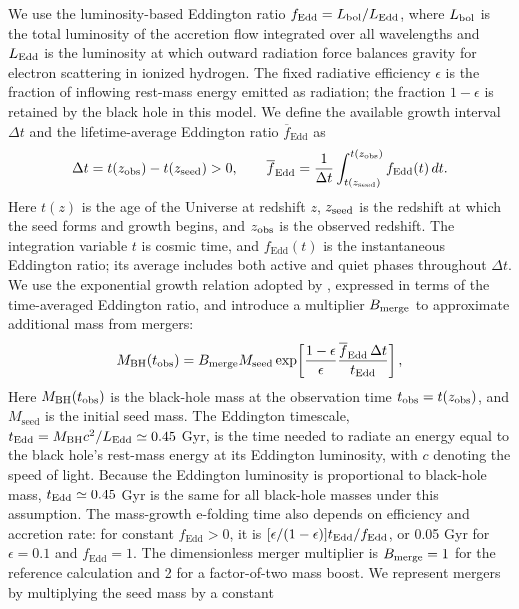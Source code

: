\documentclass[11pt]{article}
\newcommand{\fedd}{f_{\mathrm{Edd}}}
\newcommand{\mbh}{M_{\mathrm{BH}}}
\newcommand{\mseed}{M_{\mathrm{seed}}}
\begin{document}
We use the luminosity-based Eddington ratio $\fedd=L_{\rm bol}/L_{\rm Edd}$,
where $L_{\rm bol}$ is the total luminosity of the accretion flow integrated
over all wavelengths and $L_{\rm Edd}$ is the luminosity at which outward
radiation force balances gravity for electron scattering in ionized hydrogen.
The fixed radiative efficiency $\epsilon$ is the fraction of inflowing
rest-mass energy emitted as radiation; the fraction $1-\epsilon$ is retained
by the black hole in this model. We define the available growth interval
$\Delta t$ and the lifetime-average Eddington ratio $\overline{f}_{\mathrm{Edd}}$ as
\begin{equation}
\Delta t=t(z_{\rm obs})-t(z_{\rm seed})>0,\qquad
\overline{f}_{\mathrm{Edd}}=\frac{1}{\Delta t}
\int_{t(z_{\rm seed})}^{t(z_{\rm obs})}\fedd(t)\,dt.
\label{eq:average}
\end{equation}
Here $t(z)$ is the age of the Universe at redshift $z$, $z_{\rm seed}$ is
the redshift at which the seed forms and growth begins, and $z_{\rm obs}$ is
the observed redshift. The integration variable $t$ is cosmic time, and
$\fedd(t)$ is the instantaneous Eddington ratio; its average includes both
active and quiet phases throughout $\Delta t$.
We use the exponential growth relation adopted by \citet{dayal2024},
expressed in terms of the time-averaged Eddington ratio, and introduce
a multiplier $B_{\rm merge}$ to approximate additional mass from mergers:
\begin{equation}
\mbh(t_{\rm obs})=B_{\rm merge}\mseed
\exp\!\left[\frac{1-\epsilon}{\epsilon}
\frac{\overline{f}_{\mathrm{Edd}}\,\Delta t}{t_{\rm Edd}}\right],
\label{eq:growth}
\end{equation}
Here $\mbh(t_{\rm obs})$ is the black-hole mass at the observation time
$t_{\rm obs}=t(z_{\rm obs})$, and $\mseed$ is the initial seed mass.
The Eddington timescale, $t_{\rm Edd}=\mbh c^2/L_{\rm Edd}\simeq0.45$ Gyr,
is the time needed to radiate an energy equal to the black hole's rest-mass
energy at its Eddington luminosity, with $c$ denoting the speed of light.
Because the Eddington luminosity is proportional to black-hole mass,
$t_{\rm Edd}\simeq0.45$ Gyr is the same for all black-hole masses under
this assumption. The mass-growth e-folding time also depends on efficiency and
accretion rate: for constant $\fedd>0$, it is
$[\epsilon/(1-\epsilon)]t_{\rm Edd}/\fedd$, or 0.05 Gyr for
$\epsilon=0.1$ and $\fedd=1$.
The dimensionless merger multiplier is
$B_{\rm merge}=1$ for the reference calculation and 2 for a factor-of-two
mass boost. We represent mergers by multiplying the seed mass by a constant
\end{document}
